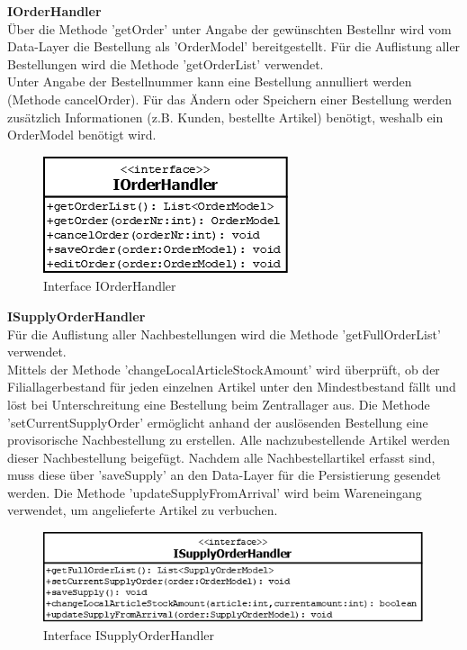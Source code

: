 \textbf{IOrderHandler}\\
Über die Methode 'getOrder' unter Angabe der gewünschten Bestellnr wird vom Data-Layer die Bestellung als 'OrderModel' bereitgestellt. Für die Auflistung aller Bestellungen wird die Methode 'getOrderList' verwendet.\\
Unter Angabe der Bestellnummer kann eine Bestellung annulliert werden (Methode cancelOrder). Für das Ändern oder Speichern einer Bestellung werden zusätzlich Informationen (z.B. Kunden, bestellte Artikel) benötigt, weshalb ein OrderModel benötigt wird. 
\begin{figure}[H]
	\includegraphics[width=0.3\linewidth]{Images/IOrderHandler}
	\caption{Interface IOrderHandler}
	\label{fig:if-IOrderHandler}
\end{figure}



\textbf{ISupplyOrderHandler}\\
Für die Auflistung aller Nachbestellungen wird die Methode 'getFullOrderList' verwendet.\\
Mittels der Methode 'changeLocalArticleStockAmount' wird überprüft, ob der Filiallagerbestand für jeden einzelnen Artikel unter den Mindestbestand fällt und löst bei Unterschreitung eine Bestellung beim Zentrallager aus. Die Methode 'setCurrentSupplyOrder' ermöglicht anhand der auslösenden Bestellung eine provisorische Nachbestellung zu erstellen. Alle nachzubestellende Artikel werden dieser Nachbestellung beigefügt. Nachdem alle Nachbestellartikel erfasst sind, muss diese über 'saveSupply' an den Data-Layer für die Persistierung gesendet werden. Die Methode 'updateSupplyFromArrival' wird beim Wareneingang verwendet, um angelieferte Artikel zu verbuchen. 
\begin{figure}[H]
	\includegraphics[width=0.6\linewidth]{Images/ISupplyOrderHandler}
	\caption{Interface ISupplyOrderHandler}
	\label{fig:if-ISupplyOrderHandler}
\end{figure}



